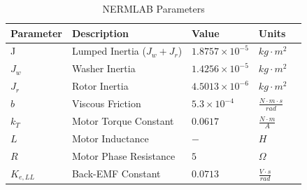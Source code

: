 \begin{table}[ht]
	\begin{center}
		\caption{NERMLAB Parameters}
		\begin{tabular}{|M{3cm}|M{3cm}|M{3cm}|M{3cm}|N}
			
			\hline
			\textbf{Parameter} & \textbf{Description} & \textbf{Value} & \textbf{Units}\\
			
			\hline
		    J & Lumped Inertia ($J_w + J_r$)  & $1.8757\times10^{-5}$ & $kg\cdot m^2$ &\\[25pt]
			
			\hline
			$J_w$ & Washer Inertia & $1.4256\times10^{-5}$ & $kg\cdot m^2$ &\\[25pt]
			
			\hline
			$J_r$ & Rotor Inertia & $4.5013\times10^{-6}$ & $kg\cdot m^2$ &\\[25pt]
			
			\hline
			$b$ & Viscous Friction & $5.3\times10^{-4}$ & $\frac{N\cdot m \cdot s}{rad}$ &\\[25pt]
			
			\hline
			$k_T$ & Motor Torque Constant & $0.0617$ & $\frac{N\cdot m}{A}$ &\\[25pt]
			
			\hline
			$L$ & Motor Inductance & $-$ & $H$ &\\[25pt]
			
			\hline
			$R$ & Motor Phase Resistance & $5$ & $\Omega$ &\\[25pt]
			
			\hline
			$K_{e,LL}$ & Back-EMF Constant & $0.0713$ & $\frac{V\cdot s}{rad}$ &\\[25pt]
			
			\hline
		\end{tabular}
		
		\label{NERMLAB_PARAMETERS}
	\end{center}
\end{table}